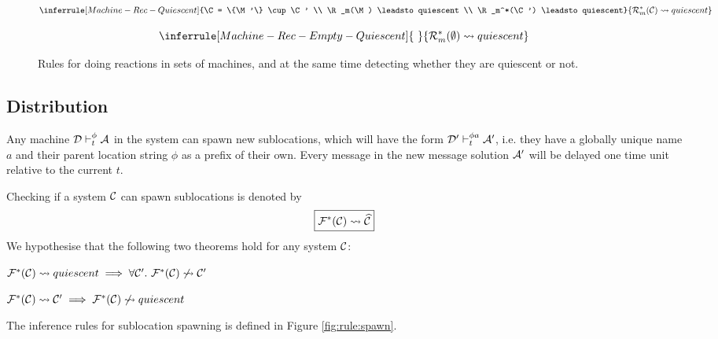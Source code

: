 \begin{figure}[!ht]
{\begin{minipage}{0.97\textwidth}
\begin{equation*}
\inferrule[Machine-Rec-Quiescent]
{\C = \{\M'\} \cup \C'
\\ \R_m(\M) \leadsto quiescent
\\ \R_m^*(\C') \leadsto quiescent}
{\R_m^*(\C) \leadsto quiescent}
\end{equation*}

\begin{equation*}
\inferrule[Machine-Rec-Empty-Quiescent]
{~}
{\R_m^*(\emptyset) \leadsto quiescent}
\end{equation*}

\end{minipage}}
\caption{Rules for doing reactions in sets of machines, and at the same time
detecting whether they are quiescent or not.\label{fig:rule:machine}}
\end{figure}

\clearpage

\subsection{Distribution}

Any machine $\mathcal{D} \vdash_t^\phi \mathcal{A}$ in the system can spawn new sublocations,
which will have the form $\mathcal{D}' \vdash_t^{\phi a} \mathcal{A}'$, i.e. they have a globally
unique name $a$ and their parent location string $\phi$ as a prefix of their
own. Every message in the new message solution $\mathcal{A}'$ will be delayed one time
unit relative to the current $t$.

Checking if a system $\mathcal{C}$ can spawn sublocations is denoted by
\begin{equation*}
\boxed{\mathcal{F}^*(\mathcal{C}) \leadsto \widehat{\mathcal{C}}}
\end{equation*}
We hypothesise that the following two theorems hold for any system $\mathcal{C}$:
\begin{theorem}
$\mathcal{F}^*(\mathcal{C}) \leadsto quiescent \implies \forall \mathcal{C}'.~ \mathcal{F}^*(\mathcal{C}) \not\leadsto \mathcal{C}'$
\end{theorem}
\begin{theorem}
$\mathcal{F}^*(\mathcal{C}) \leadsto \mathcal{C}' \implies \mathcal{F}^*(\mathcal{C}) \not\leadsto quiescent$
\end{theorem}
The inference rules for sublocation spawning is defined in Figure
\ref{fig:rule:spawn}.


